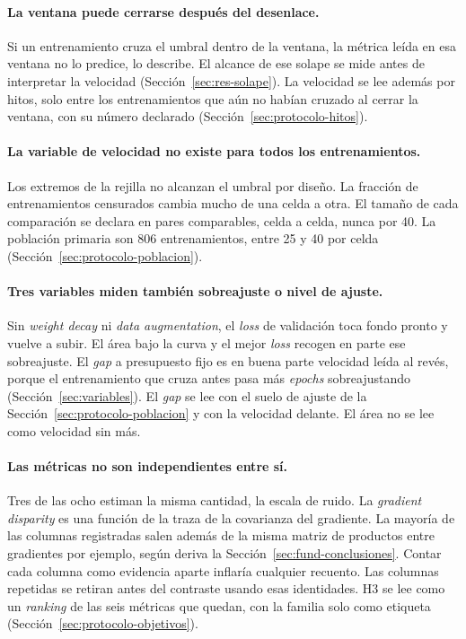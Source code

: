 \paragraph{La ventana puede cerrarse después del desenlace.} Si un entrenamiento cruza el umbral dentro de la ventana, la métrica leída en esa ventana no lo predice, lo describe. El alcance de ese solape se mide antes de interpretar la velocidad (Sección~\ref{sec:res-solape}). La velocidad se lee además por hitos, solo entre los entrenamientos que aún no habían cruzado al cerrar la ventana, con su número declarado (Sección~\ref{sec:protocolo-hitos}).

\paragraph{La variable de velocidad no existe para todos los entrenamientos.} Los extremos de la rejilla no alcanzan el umbral por diseño. La fracción de entrenamientos censurados cambia mucho de una celda a otra. El tamaño de cada comparación se declara en pares comparables, celda a celda, nunca por 40. La población primaria son 806 entrenamientos, entre 25 y 40 por celda (Sección~\ref{sec:protocolo-poblacion}).

\paragraph{Tres variables miden también sobreajuste o nivel de ajuste.} Sin \emph{weight decay} ni \emph{data augmentation}, el \emph{loss} de validación toca fondo pronto y vuelve a subir. El área bajo la curva y el mejor \emph{loss} recogen en parte ese sobreajuste. El \emph{gap} a presupuesto fijo es en buena parte velocidad leída al revés, porque el entrenamiento que cruza antes pasa más \emph{epochs} sobreajustando (Sección~\ref{sec:variables}). El \emph{gap} se lee con el suelo de ajuste de la Sección~\ref{sec:protocolo-poblacion} y con la velocidad delante. El área no se lee como velocidad sin más.

\paragraph{Las métricas no son independientes entre sí.} Tres de las ocho estiman la misma cantidad, la escala de ruido. La \emph{gradient disparity} es una función de la traza de la covarianza del gradiente. La mayoría de las columnas registradas salen además de la misma matriz de productos entre gradientes por ejemplo, según deriva la Sección~\ref{sec:fund-conclusiones}. Contar cada columna como evidencia aparte inflaría cualquier recuento. Las columnas repetidas se retiran antes del contraste usando esas identidades. H3 se lee como un \emph{ranking} de las seis métricas que quedan, con la familia solo como etiqueta (Sección~\ref{sec:protocolo-objetivos}).

